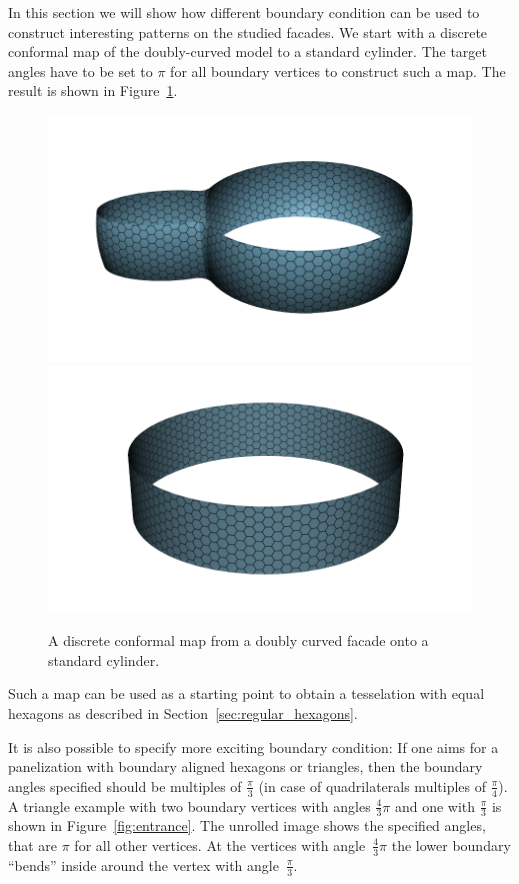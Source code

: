 \documentclass[article.tex]{subfiles}
\begin{document}
In this section we will show how different boundary condition can be
used to construct interesting patterns on the studied facades. We start
with a discrete conformal map of the doubly-curved model to a standard
cylinder. The target angles have to be set to $\pi$ for all boundary
vertices to construct such a map. The result is shown in
Figure~\ref{fig:dc_cylinder}.

\begin{figure}[tb]
  \centering
  \includegraphics[width=.49\linewidth]{images/dc_cylinder_model_hex.png}
  \hfill
  \includegraphics[width=.49\linewidth]{images/dc_cylinder_map_hex.png}
  \caption{A discrete conformal map from a doubly curved facade onto a
    standard cylinder.}
  \label{fig:dc_cylinder}
\end{figure}

Such a map can be used as a starting point to obtain a tesselation
with equal hexagons as described in
Section~\ref{sec:regular_hexagons}.

It is also possible to specify more exciting boundary condition: If
one aims for a panelization with boundary aligned hexagons or
triangles, then the boundary angles specified should be multiples of
$\tfrac{\pi}{3}$ (in case of quadrilaterals multiples of
$\tfrac{\pi}{4}$). A triangle example with two boundary vertices with
angles $\frac{4}{3}\pi$ and one with $\tfrac{\pi}{3}$ is shown in
Figure~\ref{fig:entrance}. The unrolled image shows the specified
angles, that are $\pi$ for all other vertices. At the vertices with
angle~$\tfrac{4}{3}\pi$ the lower boundary ``bends'' inside around the
vertex with angle~$\tfrac{\pi}{3}$.
\end{document}
